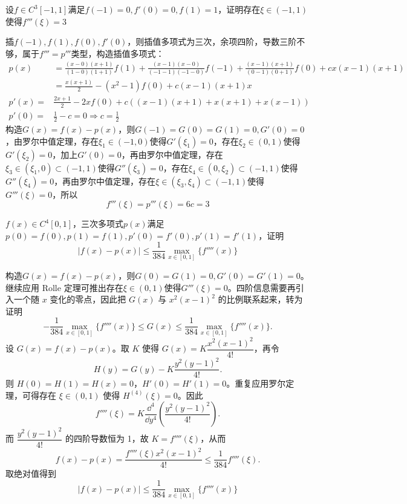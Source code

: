 \begin{example}[$f'''(\xi)=3$]
    设$f\in C^3[-1,1]$满足$f(-1)=0,f'(0)=0,f(1)=1$，证明存在$\xi\in(-1,1)$使得$f'''(\xi)=3$
\end{example}
\begin{solution}
    插$f(-1),f(1),f(0),f'(0)$，则插值多项式为三次，余项四阶，导数三阶不够，属于$f'''=p'''$类型，构造插值多项式：
\begin{align*}
p(x)&=\frac{(x-0)(x+1)}{(1-0)(1+1)}f(1)+\frac{(x-1)(x-0)}{(-1-1)(-1-0)}f(-1)+\frac{(x-1)(x+1)}{(0-1)(0+1)}f(0)+cx(x-1)(x+1)\\
&=\frac{x(x+1)}{2}-(x^2-1)f(0)+c(x-1)(x+1)x\\
p'(x)=&\frac{2x+1}{2}-2xf(0)+c\left((x-1)(x+1)+x(x+1)+x(x-1)\right)\\
p'(0)=&\frac12-c=0\Rightarrow c=\frac{1}{2}
\end{align*}
构造$G(x)=f(x)-p(x)$，则$G(-1)=G(0)=G(1)=0,G'(0)=0$，由罗尔中值定理，存在$\xi_1\in(-1,0)$使得$G'(\xi_1)=0$，存在$\xi_2\in(0,1)$使得$G'(\xi_2)=0$，加上$G'(0)=0$，再由罗尔中值定理，存在$\xi_3\in(\xi_1,0)\subset(-1,1)$使得$G''(\xi_3)=0$，存在$\xi_4\in(0,\xi_2)\subset(-1,1)$使得$G''(\xi_4)=0$，再由罗尔中值定理，存在$\xi\in(\xi_3,\xi_4)\subset(-1,1)$使得$G'''(\xi)=0$，所以\[f'''(\xi)=p'''(\xi)=6c=3\]
\end{solution}
\newpage
\def\exampletitle{$|f(x)-p(x)|\leqslant \frac1{384}\max_{x\in[0,1]}\{f''''(x)\}$}
\begin{example}[\exampletitle]
    $f(x)\in C^4[0,1]$，三次多项式$p(x)$满足$p(0)=f(0),p(1)=f(1),p'(0)=f'(0),p'(1)=f'(1)$，证明\[|f(x)-p(x)|\leqslant \frac1{384}\max_{x\in[0,1]}\{f''''(x)\}\]
\end{example}
\begin{solution}
构造$G(x)=f(x)-p(x)$，则$G(0)=G(1)=0,G'(0)=G'(1)=0$。继续应用 Rolle 定理可推出存在$\xi\in(0,1)$使得$G'''(\xi)=0$。四阶信息需要再引入一个随 $x$ 变化的零点，因此把 $G(x)$ 与 $x^2(x-1)^2$ 的比例联系起来，转为证明
\[
-\frac1{384}\max_{x\in[0,1]}\{f''''(x)\}\leqslant G(x)\leqslant \frac1{384}\max_{x\in[0,1]}\{f''''(x)\}.
\]
设 $G(x)=f(x)-p(x)$。取 $K$ 使得 $G(x)=K\dfrac{x^2(x-1)^2}{4!}$，再令
\[
H(y)=G(y)-K\dfrac{y^2(y-1)^2}{4!}.
\]
则 $H(0)=H(1)=H(x)=0$，$H'(0)=H'(1)=0$。重复应用罗尔定理，可得存在 $\xi\in(0,1)$ 使得 $H^{(4)}(\xi)=0$。因此
\[
f''''(\xi)=K\frac{\dd^4}{\dd y^4}\left(\dfrac{y^2(y-1)^2}{4!}\right).
\]
而 $\dfrac{y^2(y-1)^2}{4!}$ 的四阶导数恒为 1，故 $K=f''''(\xi)$，从而
\[
f(x)-p(x)=\dfrac{f''''(\xi)x^2(x-1)^2}{4!}\leqslant \frac{1}{384}f''''(\xi).
\]
取绝对值得到\[|f(x)-p(x)|\leqslant \frac1{384}\max_{x\in[0,1]}\{f''''(x)\}\]
\end{solution}
